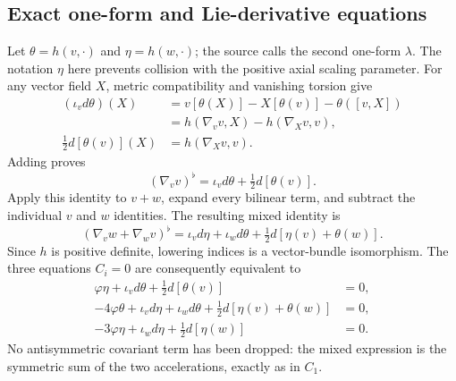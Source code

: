 \subsection{Exact one-form and Lie-derivative equations}
Let $\theta=h(v,\cdot)$ and $\eta=h(w,\cdot)$; the source calls the
second one-form $\lambda$. The notation $\eta$ here prevents collision
with the positive axial scaling parameter. For any vector field $X$,
metric compatibility and vanishing torsion give
\begin{align*}
 (\iota_vd\theta)(X)
 &=v[\theta(X)]-X[\theta(v)]-\theta([v,X])\\
 &=h(\nabla_vv,X)-h(\nabla_Xv,v),\\
 \tfrac12d[\theta(v)](X)&=h(\nabla_Xv,v).
\end{align*}
Adding proves
\begin{equation}\label{eq:wb-accel}
 (\nabla_vv)^\flat=\iota_vd\theta+\tfrac12d[\theta(v)].
\end{equation}
Apply this identity to $v+w$, expand every bilinear term, and subtract
the individual $v$ and $w$ identities. The resulting mixed identity is
\begin{equation}\label{eq:wb-polarized}
 (\nabla_vw+\nabla_wv)^\flat
 =\iota_vd\eta+\iota_wd\theta
 +\tfrac12d[\eta(v)+\theta(w)].
\end{equation}
Since $h$ is positive definite, lowering indices is a vector-bundle
isomorphism. The three equations $C_i=0$ are consequently equivalent
to
\begin{align}
 \varphi\eta+\iota_vd\theta+\tfrac12d[\theta(v)]&=0,
 \label{eq:wb-form-zero}\\
 -4\varphi\theta+\iota_vd\eta+\iota_wd\theta
 +\tfrac12d[\eta(v)+\theta(w)]&=0,
 \label{eq:wb-form-one}\\
 -3\varphi\eta+\iota_wd\eta+\tfrac12d[\eta(w)]&=0.
 \label{eq:wb-form-two}
\end{align}
No antisymmetric covariant term has been dropped: the mixed expression
is the symmetric sum of the two accelerations, exactly as in $C_1$.

